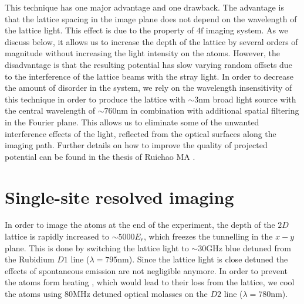 This technique has one major advantage and one drawback. The advantage is that the lattice spacing in the image plane does not depend on the wavelength of the lattice light. This effect is due to the property of $4\mathrm{f}$ imaging system. As we discuss below, it allows us to increase the depth of the lattice by several orders of magnitude without increasing the light intensity on the atoms. However, the disadvantage is that the resulting potential has slow varying random offsets due to the interference of the lattice beams with the stray light. In order to decrease the amount of disorder in the system, we rely on the wavelength insensitivity of this technique in order to produce the lattice with $\sim 3\mathrm{nm}$ broad light source with the central wavelength of $\sim 760\mathrm{nm}$ in combination with additional spatial filtering in the Fourier plane. This allows us to eliminate some of the unwanted interference effects of the light, reflected from the optical surfaces along the imaging path. Further details on how to improve the quality of projected potential can be found in the thesis of Ruichao MA \cite{MaThesis}.

\section{Single-site resolved imaging}
In order to image the atoms at the end of the experiment, the depth of the $2D$ lattice is rapidly increased to $\sim 5000 E_r$, which freezes the tunnelling in the $x-y$ plane. This is done by switching the lattice light to $\sim 30\mathrm{GHz}$ blue detuned from the Rubidium $D1$ line ($\lambda = 795\mathrm{nm}$). Since the lattice light is close detuned the effects of spontaneous emission are not negligible anymore. In order to prevent the atoms form heating \cite{Gerbier2010,Pichler2010}, which would lead to their loss from the lattice, we cool the atoms using $80\mathrm{MHz}$ detuned optical molasses on the $D2$ line ($\lambda = 780\mathrm{nm}$). 

